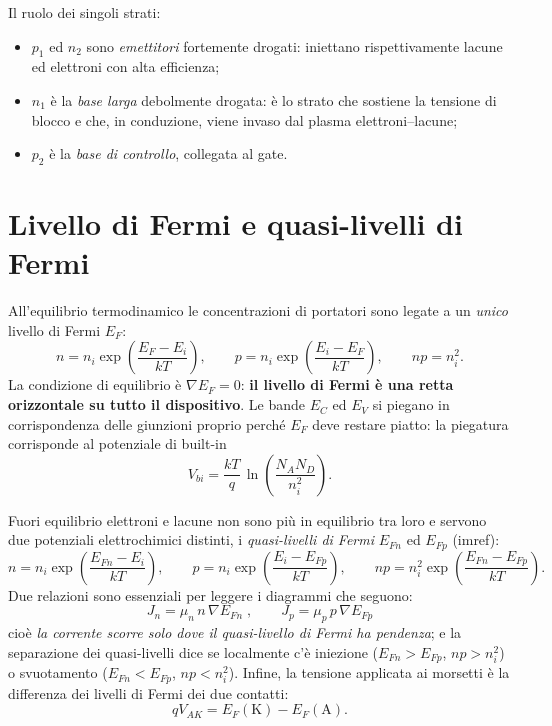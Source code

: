 \documentclass[11pt,a4paper]{article}
\begin{document}
Il ruolo dei singoli strati:
\begin{itemize}\itemsep2pt
  \item $p_1$ ed $n_2$ sono \emph{emettitori} fortemente drogati: iniettano
        rispettivamente lacune ed elettroni con alta efficienza;
  \item $n_1$ è la \emph{base larga} debolmente drogata: è lo strato che sostiene
        la tensione di blocco e che, in conduzione, viene invaso dal plasma
        elettroni--lacune;
  \item $p_2$ è la \emph{base di controllo}, collegata al gate.
\end{itemize}

\section{Livello di Fermi e quasi-livelli di Fermi}

All'equilibrio termodinamico le concentrazioni di portatori sono legate a un
\emph{unico} livello di Fermi $E_F$:
\begin{equation}
n = n_i \exp\!\left(\frac{E_F-E_i}{kT}\right),\qquad
p = n_i \exp\!\left(\frac{E_i-E_F}{kT}\right),\qquad
np = n_i^2 .
\end{equation}
La condizione di equilibrio è $\nabla E_F = 0$: \textbf{il livello di Fermi è una
retta orizzontale su tutto il dispositivo}. Le bande $E_C$ ed $E_V$ si piegano in
corrispondenza delle giunzioni proprio perché $E_F$ deve restare piatto: la
piegatura corrisponde al potenziale di built-in
\begin{equation}
V_{bi}=\frac{kT}{q}\,\ln\!\left(\frac{N_A N_D}{n_i^2}\right).
\end{equation}

Fuori equilibrio elettroni e lacune non sono più in equilibrio tra loro e servono
due potenziali elettrochimici distinti, i \emph{quasi-livelli di Fermi} $E_{Fn}$
ed $E_{Fp}$ (imref):
\begin{equation}
n = n_i \exp\!\left(\frac{E_{Fn}-E_i}{kT}\right),\qquad
p = n_i \exp\!\left(\frac{E_i-E_{Fp}}{kT}\right),\qquad
np = n_i^2 \exp\!\left(\frac{E_{Fn}-E_{Fp}}{kT}\right).
\end{equation}
Due relazioni sono essenziali per leggere i diagrammi che seguono:
\begin{equation}
\boxed{\;J_n = \mu_n\,n\,\nabla E_{Fn}\;,\qquad J_p = \mu_p\,p\,\nabla E_{Fp}\;}
\label{eq:corrente}
\end{equation}
cioè \emph{la corrente scorre solo dove il quasi-livello di Fermi ha pendenza};
e la separazione dei quasi-livelli dice se localmente c'è iniezione
($E_{Fn}>E_{Fp}$, $np>n_i^2$) o svuotamento ($E_{Fn}<E_{Fp}$, $np<n_i^2$).
Infine, la tensione applicata ai morsetti è la differenza dei livelli di Fermi
dei due contatti:
\begin{equation}
qV_{AK} = E_F(\mathrm{K}) - E_F(\mathrm{A}).
\end{equation}
\end{document}
